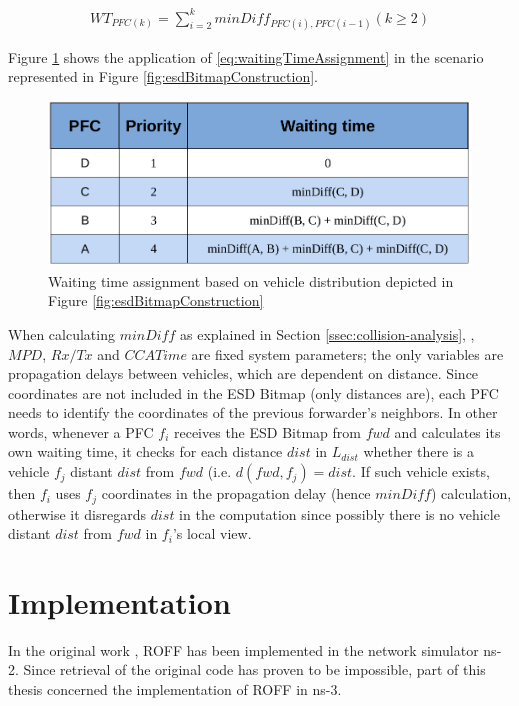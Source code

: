 			\begin{gather}
				WT_{PFC(k)} = \sum_{i=2}^{k} minDiff_{PFC(i),PFC(i-1)} (k \geq 2)
				\label{eq:waitingTimeAssignment}
			\end{gather}
			
			Figure \ref{fig:waitingTimeAssignment} shows the application of \ref{eq:waitingTimeAssignment} in the scenario represented in Figure \ref{fig:esdBitmapConstruction}.
			
			\begin{figure}[H]
				\centering
				\includegraphics[width=\textwidth]{immagini/waitingTimeAssignment}
				\caption{Waiting time assignment based on vehicle distribution depicted in Figure \ref{fig:esdBitmapConstruction}}
				\label{fig:waitingTimeAssignment}
			\end{figure}
			
			When calculating $minDiff$ as explained in Section \ref{ssec:collision-analysis}, , $MPD$, $Rx/Tx$ and $CCATime$ are fixed system parameters; the only variables are propagation delays between vehicles, which are dependent on distance. Since coordinates are not included in the ESD Bitmap (only distances are), each PFC needs to identify the coordinates of the previous forwarder's neighbors. In other words, whenever a PFC $f_i$ receives the ESD Bitmap from $fwd$ and calculates its own waiting time, it checks for each distance $dist$ in $L_{dist}$ whether there is a vehicle $f_j$ distant $dist$ from $fwd$ (i.e. $d(fwd, f_j) = dist$. If such vehicle exists, then $f_i$ uses $f_j$ coordinates in the propagation delay (hence $minDiff$) calculation, otherwise it disregards $dist$ in the computation since possibly there is no vehicle distant $dist$ from $fwd$ in $f_i$'s local view.
			
	\section{Implementation}
		In the original work \cite{6906275}, ROFF has been implemented in the network simulator ns-2. Since retrieval of the original code has proven to be impossible, part of this thesis concerned the implementation of ROFF in ns-3. 
		
